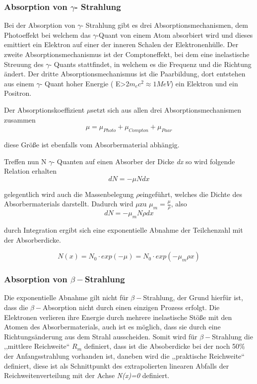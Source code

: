 \subsubsection{Absorption von $\gamma$- Strahlung}

Bei der Absorption von $\gamma$- Strahlung gibt es drei Absorptionsmechanismen,
dem Photoeffekt bei welchem das $\gamma$-Quant von einem Atom absorbiert
wird und dieses emittiert ein Elektron auf einer der inneren Schalen
der Elektronenhülle. Der zweite Absorptionsmechanismus ist der Comptoneffekt,
bei dem eine inelastische Streuung des $\gamma$- Quants stattfindet,
in welchem es die Frequenz und die Richtung ändert. Der dritte Absorptionsmechanismus
ist die Paarbildung, dort entstehen aus einem $\gamma$- Quant hoher
Energie ( E>2$m_{e}c^{2}\approx 1MeV$) ein Elektron und ein Positron.

Der Absorptionskoeffizient $\mu$setzt sich aus allen drei Absorptionsmechanismen
zusammen
\begin{equation}
	\mu=\mu_{Photo}+\mu_{Compton}+\mu_{Paar}
\end{equation}


diese Größe ist ebenfalls vom Absorbermaterial abhängig.

Treffen nun N $\gamma$- Quanten auf einen Absorber der Dicke \emph{dx
}so wird folgende Relation erhalten
\begin{equation}
	dN=-\mu Ndx
\end{equation}


gelegentlich wird auch die Massenbelegung $\rho$eingeführt, welches
die Dichte des Absorbermaterials darstellt. Dadurch wird $\mu$zu
$\mu_{m}=\frac{\mu}{\rho}$, also 
\begin{equation}
	dN=-\mu_{m}N\rho dx
\end{equation}


durch Integration ergibt sich eine exponentielle Abnahme der Teilchenzahl
mit der Absorberdicke.

\begin{equation}
	N(x)=N_{0}\cdot exp(-\mu)=N_{0}\cdot exp(-\mu_{m}\rho x)
\end{equation}



\subsubsection{Absorption von $\beta-$Strahlung}

Die exponentielle Abnahme gilt nicht für $\beta-$Strahlung, der Grund
hierfür ist, dass die $\beta-$Absorption nicht durch einen einzigen
Prozess erfolgt. Die Elektronen verlieren ihre Energie durch mehrere
inelastische Stöße mit den Atomen des Absorbermaterials, auch ist
es möglich, dass sie durch eine Richtungsänderung aus dem Strahl ausscheiden.
Somit wird für $\beta-$Strahlung die ,,mittlere Reichweite`` $R_{m}$
definiert, dass ist die Absoberdicke bei der noch 50\% der Anfangsstrahlung
vorhanden ist, daneben wird die ,,praktische Reichweite`` definiert,
diese ist als Schnittpunkt des extrapolierten linearen Abfalls der
Reichweitenverteilung mit der Achse \emph{N(x)=0 }definiert.


